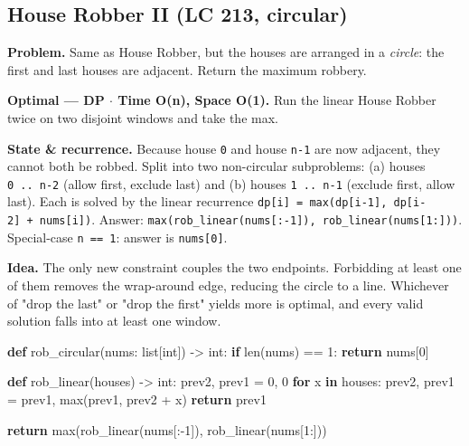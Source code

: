 \documentclass[11pt]{article}
\newenvironment{Shaded}{\begin{snugshade}}{\end{snugshade}}
\newcommand{\BuiltInTok}[1]{\textcolor[rgb]{0.50,0.55,0.55}{#1}}
\newcommand{\ControlFlowTok}[1]{\textcolor[rgb]{0.99,0.74,0.29}{\textbf{#1}}}
\newcommand{\DecValTok}[1]{\textcolor[rgb]{0.96,0.45,0.00}{#1}}
\newcommand{\KeywordTok}[1]{\textcolor[rgb]{0.81,0.81,0.76}{\textbf{#1}}}
\newcommand{\NormalTok}[1]{\textcolor[rgb]{0.81,0.81,0.76}{#1}}
\newcommand{\OperatorTok}[1]{\textcolor[rgb]{0.81,0.81,0.76}{#1}}
\begin{document}
\subsection{House Robber II (LC 213, circular)}\label{house-robber-ii-lc-213-circular}

\textbf{Problem.} Same as House Robber, but the houses are arranged in a \emph{circle}: the first and last houses are adjacent. Return the maximum robbery.

\textbf{Optimal --- DP \(\cdot\) Time O(n), Space O(1).} Run the linear House Robber twice on two disjoint windows and take the max.

\textbf{State \& recurrence.} Because house \texttt{0} and house \texttt{n-1} are now adjacent, they cannot both be robbed. Split into two non-circular subproblems: (a) houses \texttt{0\ ..\ n-2} (allow first, exclude last) and (b) houses \texttt{1\ ..\ n-1} (exclude first, allow last). Each is solved by the linear recurrence \texttt{dp{[}i{]}\ =\ max(dp{[}i-1{]},\ dp{[}i-2{]}\ +\ nums{[}i{]})}. Answer: \texttt{max(rob\_linear(nums{[}:-1{]}),\ rob\_linear(nums{[}1:{]}))}. Special-case \texttt{n\ ==\ 1}: answer is \texttt{nums{[}0{]}}.

\textbf{Idea.} The only new constraint couples the two endpoints. Forbidding at least one of them removes the wrap-around edge, reducing the circle to a line. Whichever of "drop the last" or "drop the first" yields more is optimal, and every valid solution falls into at least one window.


\begin{Shaded}
\begin{Highlighting}[]
\KeywordTok{def}\NormalTok{ rob\_circular(nums: }\BuiltInTok{list}\NormalTok{[}\BuiltInTok{int}\NormalTok{]) }\OperatorTok{{-}\textgreater{}} \BuiltInTok{int}\NormalTok{:}
    \ControlFlowTok{if} \BuiltInTok{len}\NormalTok{(nums) }\OperatorTok{==} \DecValTok{1}\NormalTok{:}
        \ControlFlowTok{return}\NormalTok{ nums[}\DecValTok{0}\NormalTok{]}

    \KeywordTok{def}\NormalTok{ rob\_linear(houses) }\OperatorTok{{-}\textgreater{}} \BuiltInTok{int}\NormalTok{:}
\NormalTok{        prev2, prev1 }\OperatorTok{=} \DecValTok{0}\NormalTok{, }\DecValTok{0}
        \ControlFlowTok{for}\NormalTok{ x }\KeywordTok{in}\NormalTok{ houses:}
\NormalTok{            prev2, prev1 }\OperatorTok{=}\NormalTok{ prev1, }\BuiltInTok{max}\NormalTok{(prev1, prev2 }\OperatorTok{+}\NormalTok{ x)}
        \ControlFlowTok{return}\NormalTok{ prev1}

    \ControlFlowTok{return} \BuiltInTok{max}\NormalTok{(rob\_linear(nums[:}\OperatorTok{{-}}\DecValTok{1}\NormalTok{]), rob\_linear(nums[}\DecValTok{1}\NormalTok{:]))}
\end{Highlighting}
\end{Shaded}
\end{document}
